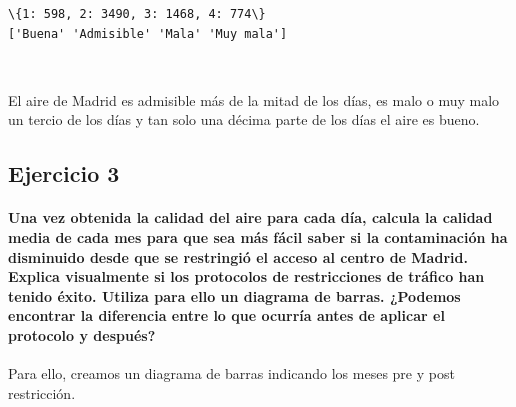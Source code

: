 \documentclass[11pt]{article}
\begin{document}
    \begin{Verbatim}[commandchars=\\\{\}]
\{1: 598, 2: 3490, 3: 1468, 4: 774\}
['Buena' 'Admisible' 'Mala' 'Muy mala']

    \end{Verbatim}

    \begin{center}
    \end{center}
    { \hspace*{\fill} \\}
    
    El aire de Madrid es admisible más de la mitad de los días, es malo o
muy malo un tercio de los días y tan solo una décima parte de los días
el aire es bueno.

    \subsection{Ejercicio 3}\label{ejercicio-3}

\paragraph{Una vez obtenida la calidad del aire para cada día, calcula
la calidad media de cada mes para que sea más fácil saber si la
contaminación ha disminuido desde que se restringió el acceso al centro
de Madrid. Explica visualmente si los protocolos de restricciones de
tráfico han tenido éxito. Utiliza para ello un diagrama de barras.
¿Podemos encontrar la diferencia entre lo que ocurría antes de aplicar
el protocolo y
después?}\label{una-vez-obtenida-la-calidad-del-aire-para-cada-duxeda-calcula-la-calidad-media-de-cada-mes-para-que-sea-muxe1s-fuxe1cil-saber-si-la-contaminaciuxf3n-ha-disminuido-desde-que-se-restringiuxf3-el-acceso-al-centro-de-madrid.-explica-visualmente-si-los-protocolos-de-restricciones-de-truxe1fico-han-tenido-uxe9xito.-utiliza-para-ello-un-diagrama-de-barras.-podemos-encontrar-la-diferencia-entre-lo-que-ocurruxeda-antes-de-aplicar-el-protocolo-y-despuuxe9s}

    Para ello, creamos un diagrama de barras indicando los meses pre y post
restricción.
\end{document}
